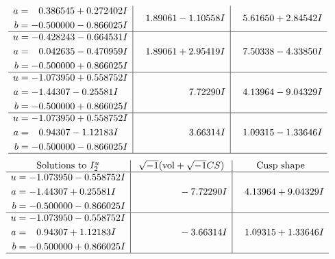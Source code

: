 \documentclass[1p]{elsarticle_modified}
\theoremstyle{definition}
\newcommand{\I}{\sqrt{-1}}
\begin{document}
$$\begin{array}{c|c|c}
\begin{aligned}
a &= \phantom{-}0.386545 + 0.272402 I \\
b &= -0.500000 - 0.866025 I\end{aligned}
 & \phantom{-}1.89061 - 1.10558 I & \phantom{-}5.61650 + 2.84542 I \\ \hline\begin{aligned}
u &= -0.428243 - 0.664531 I \\
a &= \phantom{-}0.042635 - 0.470959 I \\
b &= -0.500000 + 0.866025 I\end{aligned}
 & \phantom{-}1.89061 + 2.95419 I & \phantom{-}7.50338 - 4.33850 I \\ \hline\begin{aligned}
u &= -1.073950 + 0.558752 I \\
a &= -1.44307 - 0.25581 I \\
b &= -0.500000 + 0.866025 I\end{aligned}
 & \phantom{-0.000000 -}7.72290 I & \phantom{-}4.13964 - 9.04329 I \\ \hline\begin{aligned}
u &= -1.073950 + 0.558752 I \\
a &= \phantom{-}0.94307 - 1.12183 I \\
b &= -0.500000 - 0.866025 I\end{aligned}
 & \phantom{-0.000000 -}3.66314 I & \phantom{-}1.09315 - 1.33646 I\\
 \hline 
 \end{array}$$\newpage$$\begin{array}{c|c|c}  
\text{Solutions to }I^u_{2}& \I (\text{vol} + \sqrt{-1}CS) & \text{Cusp shape}\\
 \hline 
\begin{aligned}
u &= -1.073950 - 0.558752 I \\
a &= -1.44307 + 0.25581 I \\
b &= -0.500000 - 0.866025 I\end{aligned}
 & \phantom{-0.000000 } -7.72290 I & \phantom{-}4.13964 + 9.04329 I \\ \hline\begin{aligned}
u &= -1.073950 - 0.558752 I \\
a &= \phantom{-}0.94307 + 1.12183 I \\
b &= -0.500000 + 0.866025 I\end{aligned}
 & \phantom{-0.000000 } -3.66314 I & \phantom{-}1.09315 + 1.33646 I\\
 \hline 
 \end{array}$$\newpage
\end{document}
